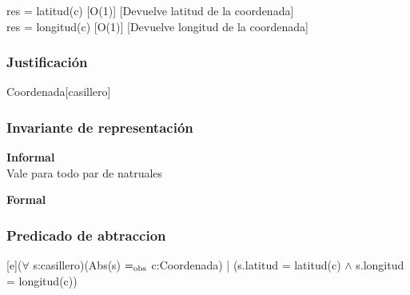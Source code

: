 {res = latitud(c)}
[O(1)]
[Devuelve latitud de la coordenada]
\\

{res = longitud(c)}
[O(1)]
[Devuelve longitud de la coordenada]
\\

\begin{Representacion}
\subsubsection{Justificación}
	\begin{Estructura}{Coordenada}[casillero]
		\begin{Tupla}[casillero]
		\end{Tupla}
	\end{Estructura}
	
\subsubsection{Invariante de representación}

\textbf{Informal}\\

Vale para todo par de natruales

\textbf{Formal}\\


\subsubsection{Predicado de abtraccion}

[e]{($\forall$ s:casillero)(Abs(s) $=_{\mathrm{obs}}$ c:Coordenada) | (s.latitud = latitud(c) $\wedge$ s.longitud = longitud(c))}

\end{Representacion}

